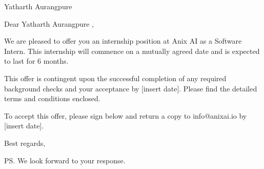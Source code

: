 \documentclass[a4paper,12pt]{letter}
\date{\today}
\begin{document}
    \begin{letter}{Yatharth Aurangpure }

    \opening{Dear Yatharth Aurangpure ,}

    We are pleased to offer you an internship position at Anix AI as a Software Intern. This internship will commence on a mutually agreed date and is expected to last for 6 months.

    This offer is contingent upon the successful completion of any required background checks and your acceptance by [insert date]. Please find the detailed terms and conditions enclosed.

    To accept this offer, please sign below and return a copy to info@anixai.io by [insert date].

    \closing{Best regards,}
    \ps{We look forward to your response.}

    \end{letter}
    
\end{document}
